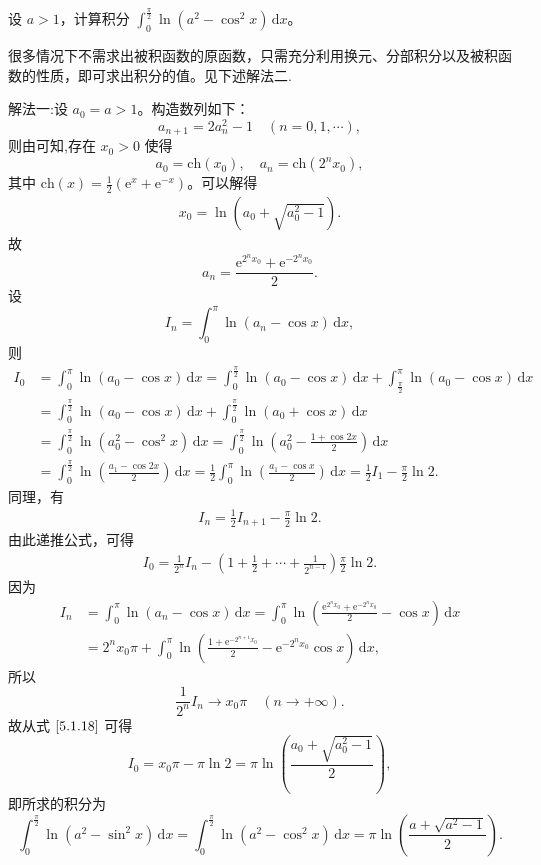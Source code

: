 \documentclass[../../main.tex]{subfiles}
\begin{document}
\begin{example}
设 \( a > 1 \)，计算积分 \( \int_{0}^{\frac{\pi}{2}} \ln(a^2 - \cos^2 x) \, \mathrm{d}x \)。
\end{example}
\begin{remark}
很多情况下不需求出被积函数的原函数，只需充分利用换元、分部积分以及被积函数的性质，即可求出积分的值。见下述解法二.
\end{remark}
\begin{solution}
{\color{blue}解法一:}设 \( a_0 = a > 1 \)。构造数列如下：
\[
a_{n + 1} = 2a_n^2 - 1 \quad (n = 0, 1, \cdots),
\]
则由可知,存在 \( x_0 > 0 \) 使得
\[
a_0 = \text{ch}(x_0), \quad a_n = \text{ch}(2^n x_0),
\]
其中 \( \text{ch}(x) = \frac{1}{2}(\text{e}^x + \text{e}^{-x}) \)。可以解得
\begin{align}
x_0 = \ln \left( a_0 + \sqrt{a_0^2 - 1} \right). \label{5.1.16}
\end{align}
故
\[
a_n = \frac{\text{e}^{2^n x_0} + \text{e}^{-2^n x_0}}{2}.
\]
设
\[
I_n = \int_{0}^{\pi} \ln(a_n - \cos x) \, \mathrm{d}x,
\]
则
\begin{align*}
I_0 &= \int_{0}^{\pi} \ln(a_0 - \cos x) \, \mathrm{d}x = \int_{0}^{\frac{\pi}{2}} \ln(a_0 - \cos x) \, \mathrm{d}x + \int_{\frac{\pi}{2}}^{\pi} \ln(a_0 - \cos x) \, \mathrm{d}x
\\
&= \int_{0}^{\frac{\pi}{2}} \ln(a_0 - \cos x) \, \mathrm{d}x + \int_{0}^{\frac{\pi}{2}} \ln(a_0 + \cos x) \, \mathrm{d}x
\\
&= \int_{0}^{\frac{\pi}{2}} \ln(a_0^2 - \cos^2 x) \, \mathrm{d}x = \int_{0}^{\frac{\pi}{2}} \ln \left( a_0^2 - \frac{1 + \cos 2x}{2} \right) \, \mathrm{d}x
\\
&= \int_{0}^{\frac{\pi}{2}} \ln \left( \frac{a_1 - \cos 2x}{2} \right) \, \mathrm{d}x = \frac{1}{2} \int_{0}^{\pi} \ln \left( \frac{a_1 - \cos x}{2} \right) \, \mathrm{d}x = \frac{1}{2} I_1 - \frac{\pi}{2} \ln 2.
\end{align*}
同理，有
\begin{align}
I_n = \frac{1}{2} I_{n + 1} - \frac{\pi}{2} \ln 2. \label{5.1.17}
\end{align}
由此递推公式，可得
\begin{align}
I_0 = \frac{1}{2^n} I_n - \left( 1 + \frac{1}{2} + \cdots + \frac{1}{2^{n - 1}} \right) \frac{\pi}{2} \ln 2. \label{5.1.18}
\end{align}
因为
\begin{align*}
I_n &= \int_{0}^{\pi} \ln(a_n - \cos x) \, \mathrm{d}x = \int_{0}^{\pi} \ln \left( \frac{\text{e}^{2^n x_0} + \text{e}^{-2^n x_0}}{2} - \cos x \right) \, \mathrm{d}x
\\
&= 2^n x_0 \pi + \int_{0}^{\pi} \ln \left( \frac{1 + \text{e}^{-2^{n + 1} x_0}}{2} - \text{e}^{-2^n x_0} \cos x \right) \, \mathrm{d}x,
\end{align*}
所以
\[
\frac{1}{2^n} I_n \to x_0 \pi \quad (n \to +\infty).
\]
故从式 \(\eqref{5.1.18}\) 可得
\[
I_0 = x_0 \pi - \pi \ln 2 = \pi \ln \left( \frac{a_0 + \sqrt{a_0^2 - 1}}{2} \right),
\]
即所求的积分为
\[
\int_{0}^{\frac{\pi}{2}} \ln(a^2 - \sin^2 x) \, \mathrm{d}x = \int_{0}^{\frac{\pi}{2}} \ln(a^2 - \cos^2 x) \, \mathrm{d}x = \pi \ln \left( \frac{a + \sqrt{a^2 - 1}}{2} \right).
\]


\end{solution}
\end{document}
